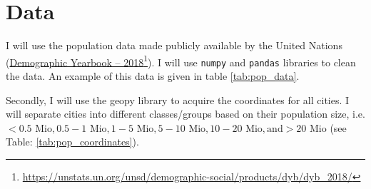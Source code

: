 \documentclass[11pt,a4paper,final]{article}
\begin{document}
\section{Data}
I will use the population data made publicly available by the United Nations (\href{https://unstats.un.org/unsd/demographic-social/products/dyb/documents/DYB2018/table08.xls}{Demographic Yearbook – 2018}\footnote{\url{https://unstats.un.org/unsd/demographic-social/products/dyb/dyb_2018/}}). I will use \texttt{numpy} and \texttt{pandas} libraries to clean the data. An example of this data is given in table \ref{tab:pop_data}.

\begin{table}[h!]
\centering
{}\caption{Cleaned population data}\label{tab:pop_data}
\end{table}

Secondly, I will use the geopy library to acquire the coordinates for all cities. I will separate cities into different classes/groups based on their population size, i.e. $ < 0.5\text{ Mio}, 0.5-1\text{ Mio}, 1-5\text{ Mio}, 5-10\text{ Mio}, 10-20\text{ Mio}, \text{and} >20\text{ Mio}$ (see Table: \ref{tab:pop_coordinates}).\\
\end{document}
